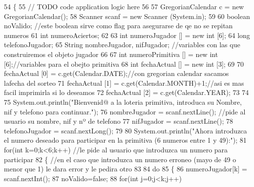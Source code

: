\begin{DoxyCode}
54                                            \{
55         \textcolor{comment}{// TODO code application logic here}
56         
57         GregorianCalendar c = \textcolor{keyword}{new} GregorianCalendar();
58         Scanner scanf = \textcolor{keyword}{new} Scanner (System.in);
59         
60         \textcolor{keywordtype}{boolean} noValido; \textcolor{comment}{//este boolean sirve como flag para asegurarse de qe no se repitan numeros}
61         \textcolor{keywordtype}{int} numeroAciertos;
62         
63         \textcolor{keywordtype}{int} numeroJugador [] = \textcolor{keyword}{new} \textcolor{keywordtype}{int} [6];
64         \textcolor{keywordtype}{long} telefonoJugador;
65         String nombreJugador, nifJugador;  \textcolor{comment}{//variables con las que construiremos el objeto jugador}
66         
67         \textcolor{keywordtype}{int} numeroPrimitiva [] = \textcolor{keyword}{new} \textcolor{keywordtype}{int} [6];\textcolor{comment}{//variables para el obejto primitiva}
68         \textcolor{keywordtype}{int} fechaActual [] = \textcolor{keyword}{new} \textcolor{keywordtype}{int} [3];
69         
70         fechaActual [0] = c.get(Calendar.DATE);\textcolor{comment}{//con gregorian calendar sacamos lafecha del sorteo}
71         fechaActual [1] = c.get(Calendar.MONTH)+1;\textcolor{comment}{//asi es mas facil imprimirla si lo deseamos}
72         fechaActual [2] = c.get(Calendar.YEAR);
73         
74         
75         System.out.println(\textcolor{stringliteral}{"Bienvenid@ a la loteria primitiva, introduca su Nombre, nif y telefono para
       continuar."});
76         nombreJugador = scanf.nextLine();       \textcolor{comment}{//pide al usuario su nombre, nif y nº de telefono}
77         nifJugador = scanf.nextLine(); 
78         telefonoJugador = scanf.nextLong();
79         
80         System.out.println(\textcolor{stringliteral}{"Ahora introduzca el numero deseado para participar en la primitiva (6 numeros
       entre 1 y 49):"});
81         \textcolor{keywordflow}{for}(\textcolor{keywordtype}{int} k=0;k<6;k++)        \textcolor{comment}{//le pide al usuario que introduzca un numero para participar}
82         \{                           \textcolor{comment}{//en el caso que introduzca un numero erroneo (mayo de 49 o menor que
       1) le dara error y le pedira otro}
83             
84                     \textcolor{keywordflow}{do}
85                     \{
86                     numeroJugador[k] = scanf.nextInt();
87                     noValido=\textcolor{keyword}{false};
88                     \textcolor{keywordflow}{for}(\textcolor{keywordtype}{int} j=0;j<k;j++)

\end{DoxyCode}
